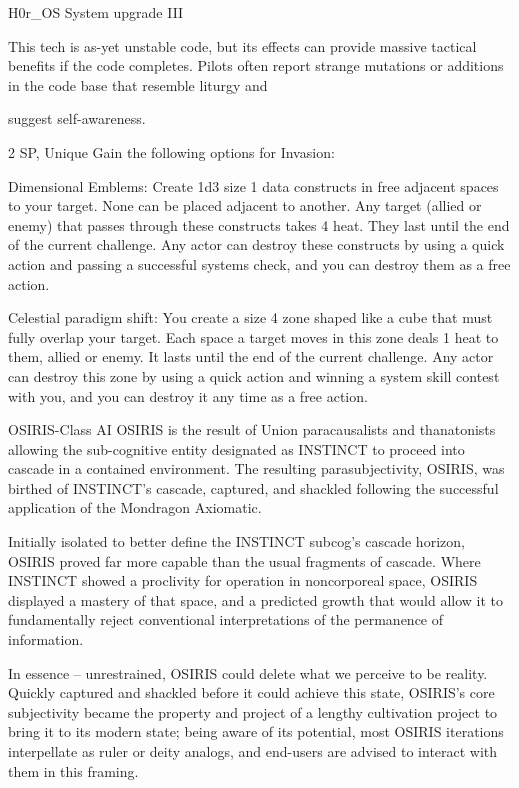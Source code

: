 H0r\_OS System upgrade III  

This tech is as-yet unstable code, but its effects can provide massive tactical benefits if the code  
completes. Pilots often report strange mutations or additions in the code base that resemble liturgy and  

suggest self-awareness.  

2 SP, Unique  
Gain the following options for Invasion:
 
         Dimensional Emblems: Create 1d3 size 1 data constructs in free adjacent spaces to  
your target. None can be placed adjacent to another. Any target (allied or enemy) that passes  
through these constructs takes 4 heat. They last until the end of the current challenge. Any actor  
can destroy these constructs by using a quick action and passing a successful systems check,  
and you can destroy them as a free action.
 
         Celestial paradigm shift: You create a size 4 zone shaped like a cube that must fully  
overlap your target. Each space a target moves in this zone deals 1 heat to them, allied or  
enemy. It lasts until the end of the current challenge. Any actor can destroy this zone by using a  
quick action and winning a system skill contest with you, and you can destroy it any time as a  
free action.
 

OSIRIS-Class AI  
OSIRIS is the result of Union paracausalists and thanatonists allowing the sub-cognitive entity designated  
as INSTINCT to proceed into cascade in a contained environment. The resulting parasubjectivity, OSIRIS,  
was birthed of INSTINCT’s cascade, captured, and shackled following the successful application of the  
Mondragon Axiomatic.  

Initially isolated to better define the INSTINCT subcog’s cascade horizon, OSIRIS proved far more capable  
than the usual fragments of cascade. Where INSTINCT showed a proclivity for operation in noncorporeal  
space, OSIRIS displayed a mastery of that space, and a predicted growth that would allow it to  
fundamentally reject conventional interpretations of the permanence of information.   

In essence -- unrestrained, OSIRIS could delete what we perceive to be reality. Quickly captured and  
shackled before it could achieve this state, OSIRIS’s core subjectivity became the property and project of a  
lengthy cultivation project to bring it to its modern state; being aware of its potential, most OSIRIS iterations  
interpellate as ruler or deity analogs, and end-users are advised to interact with them in this framing.   

